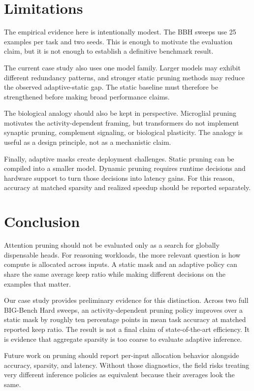 \documentclass{article}
\begin{document}
\section{Limitations}

The empirical evidence here is intentionally modest. The BBH sweeps use 25
examples per task and two seeds. This is enough to motivate the evaluation
claim, but it is not enough to establish a definitive benchmark result.

The current case study also uses one model family. Larger models may exhibit
different redundancy patterns, and stronger static pruning methods may reduce
the observed adaptive-static gap. The static baseline must therefore be
strengthened before making broad performance claims.

The biological analogy should also be kept in perspective. Microglial pruning
motivates the activity-dependent framing, but transformers do not implement
synaptic pruning, complement signaling, or biological plasticity. The analogy
is useful as a design principle, not as a mechanistic claim.

Finally, adaptive masks create deployment challenges. Static pruning can be
compiled into a smaller model. Dynamic pruning requires runtime decisions and
hardware support to turn those decisions into latency gains. For this reason,
accuracy at matched sparsity and realized speedup should be reported
separately.

\section{Conclusion}

Attention pruning should not be evaluated only as a search for globally
dispensable heads. For reasoning workloads, the more relevant question is how
compute is allocated across inputs. A static mask and an adaptive policy can
share the same average keep ratio while making different decisions on the
examples that matter.

Our case study provides preliminary evidence for this distinction. Across two
full BIG-Bench Hard sweeps, an activity-dependent pruning policy improves over
a static mask by roughly ten percentage points in mean task accuracy at matched
reported keep ratio. The result is not a final claim of state-of-the-art
efficiency. It is evidence that aggregate sparsity is too coarse to evaluate
adaptive inference.

Future work on pruning should report per-input allocation behavior alongside
accuracy, sparsity, and latency. Without those diagnostics, the field risks
treating very different inference policies as equivalent because their averages
look the same.
\end{document}
